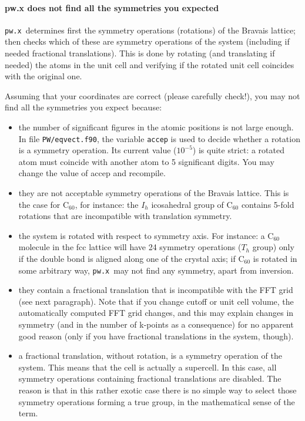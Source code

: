 \documentclass[12pt,a4paper]{article}
\def\pwx{\texttt{pw.x}}
\begin{document}
\paragraph{pw.x does not find all the symmetries you expected} 
\pwx\ determines first the symmetry operations (rotations) of the
Bravais lattice; then checks which of these are symmetry operations of
the system (including if needed fractional translations). This is done
by rotating (and translating if needed) the atoms in the unit cell and
verifying if the rotated unit cell coincides with the original one.

Assuming that your coordinates are correct (please carefully check!),
you may not find all the symmetries you expect because:
\begin{itemize}
\item the number of significant figures in the atomic positions is not
  large enough. In file \texttt{PW/eqvect.f90}, the variable \texttt{accep} is used to
  decide whether a rotation is a symmetry operation. Its current value
  ($10^{-5}$) is quite strict: a rotated atom must coincide with
  another atom to 5 significant digits. You may change the value of
  accep and recompile. 
\item they are not acceptable symmetry operations of the Bravais
  lattice. This is the case for C$_{60}$, for instance: the $I_h$
  icosahedral group of C$_{60}$ contains 5-fold rotations that are
  incompatible with translation symmetry.  
\item  the system is rotated with respect to symmetry axis. For
  instance: a C$_{60}$ molecule in the fcc lattice will have 24
  symmetry operations ($T_h$ group) only if the double bond is
  aligned along one of the crystal axis; if C$_{60}$ is rotated
  in some arbitrary way, \pwx\ may not find any symmetry, apart from
  inversion. 
\item they contain a fractional translation that is incompatible with
  the FFT grid (see next paragraph). Note that if you change cutoff or
  unit cell volume, the automatically computed FFT grid changes, and
  this may explain changes in symmetry (and in the number of k-points
  as a consequence) for no apparent good reason (only if you have
  fractional translations in the system, though). 
\item a fractional translation, without rotation, is a symmetry
  operation of the system. This means that the cell is actually a
  supercell. In this case, all symmetry operations containing
  fractional translations are disabled. The reason is that in this
  rather exotic case there is no simple way to select those symmetry
  operations forming a true group, in the mathematical sense of the
  term. 
\end{itemize}
\end{document}
